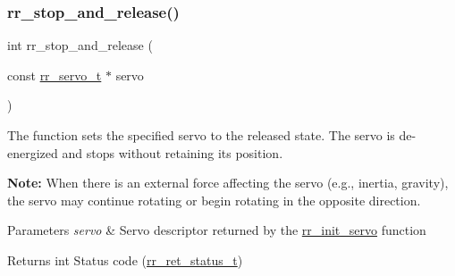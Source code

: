 \subsubsection{\texorpdfstring{rr\+\_\+stop\+\_\+and\+\_\+release()}{rr\_stop\_and\_release()}}
{\footnotesize\ttfamily int rr\+\_\+stop\+\_\+and\+\_\+release (\begin{DoxyParamCaption}\item[{const \hyperlink{structrr__servo__t}{rr\+\_\+servo\+\_\+t} $\ast$}]{servo }\end{DoxyParamCaption})}



The function sets the specified servo to the released state. The servo is de-\/energized and stops without retaining its position. 

{\bfseries Note\+:} When there is an external force affecting the servo (e.\+g., inertia, gravity), the servo may continue rotating or begin rotating in the opposite direction.


\begin{DoxyParams}{Parameters}
{\em servo} & Servo descriptor returned by the \hyperlink{group___common_ga0adb313a3eeb8a4399431e940a1f3e9e}{rr\+\_\+init\+\_\+servo} function \\
\hline
\end{DoxyParams}
\begin{DoxyReturn}{Returns}
int Status code (\hyperlink{api_8h_a92d5be5038abcf89837faf85a08debdc}{rr\+\_\+ret\+\_\+status\+\_\+t}) 
\end{DoxyReturn}
